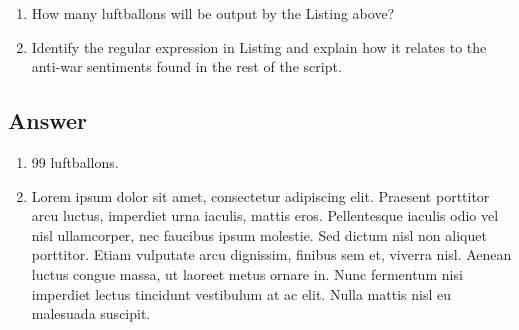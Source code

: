 \documentclass[
	12pt, %
]{fphw}
\begin{document}
\begin{problem}
	
	
	\begin{enumerate}
		\item How many luftballons will be output by the Listing  above?
		\item Identify the regular expression in Listing  and explain how it relates to the anti-war sentiments found in the rest of the script.
	\end{enumerate}

\end{problem}


\subsection{Answer}

\begin{enumerate}
	\item 99 luftballons.
	\item Lorem ipsum dolor sit amet, consectetur adipiscing elit. Praesent porttitor arcu luctus, imperdiet urna iaculis, mattis eros. Pellentesque iaculis odio vel nisl ullamcorper, nec faucibus ipsum molestie. Sed dictum nisl non aliquet porttitor. Etiam vulputate arcu dignissim, finibus sem et, viverra nisl. Aenean luctus congue massa, ut laoreet metus ornare in. Nunc fermentum nisi imperdiet lectus tincidunt vestibulum at ac elit. Nulla mattis nisl eu malesuada suscipit.
\end{enumerate}

\end{document}
